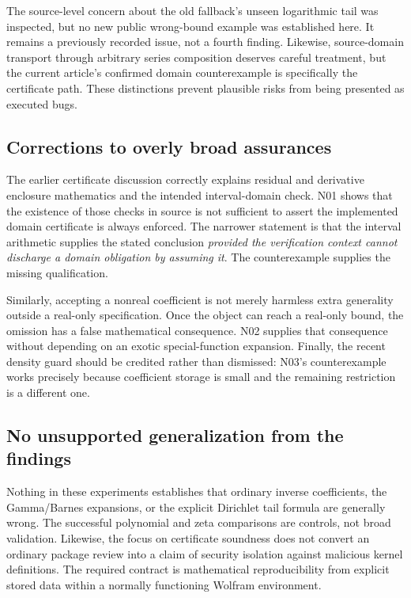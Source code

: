 \documentclass[11pt,a4paper]{article}
\newcommand{\code}[1]{\texttt{\detokenize{#1}}}
\begin{document}
The source-level concern about the old \code{fwdSeries} fallback's unseen logarithmic tail was inspected, but no new public wrong-bound example was established here. It remains a previously recorded issue, not a fourth finding. Likewise, source-domain transport through arbitrary series composition deserves careful treatment, but the current article's confirmed domain counterexample is specifically the certificate path. These distinctions prevent plausible risks from being presented as executed bugs.

\subsection{Corrections to overly broad assurances}
The earlier certificate discussion correctly explains residual and derivative enclosure mathematics and the intended interval-domain check. N01 shows that the existence of those checks in source is not sufficient to assert the implemented domain certificate is always enforced. The narrower statement is that the interval arithmetic supplies the stated conclusion \emph{provided the verification context cannot discharge a domain obligation by assuming it}. The counterexample supplies the missing qualification.\cite{review7,repo-cert}

Similarly, accepting a nonreal coefficient is not merely harmless extra generality outside a real-only specification. Once the object can reach a real-only bound, the omission has a false mathematical consequence. N02 supplies that consequence without depending on an exotic special-function expansion. Finally, the recent density guard should be credited rather than dismissed: N03's counterexample works precisely because coefficient storage is small and the remaining restriction is a different one.

\subsection{No unsupported generalization from the findings}
Nothing in these experiments establishes that ordinary inverse coefficients, the Gamma/Barnes expansions, or the explicit Dirichlet tail formula are generally wrong. The successful polynomial and zeta comparisons are controls, not broad validation. Likewise, the focus on certificate soundness does not convert an ordinary package review into a claim of security isolation against malicious kernel definitions. The required contract is mathematical reproducibility from explicit stored data within a normally functioning Wolfram environment.
\end{document}
